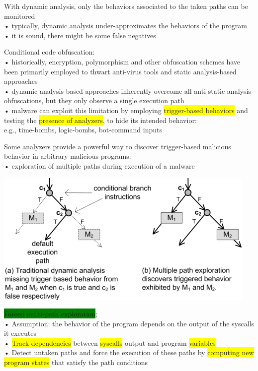 \documentclass[]{project_plan}
\begin{document}
With dynamic analysis, only the behaviors associated to the taken paths can be monitored\\
• typically, dynamic analysis under-approximates the behaviors of the program\\
• it is sound, there might be some false negatives

Conditional code obfuscation:\\
• historically, encryption, polymorphism and other obfuscation schemes have been primarily employed to
thwart anti-virus tools and static analysis-based approaches\\
• dynamic analysis based approaches inherently overcome all anti-static analysis obfuscations, but they
only observe a single execution path\\
• malware can exploit this limitation by employing \colorbox{yellow}{trigger-based behaviors} and testing the \colorbox{yellow}{presence of
  analyzers}, to hide its intended behavior:\\
e.g., time-bombs, logic-bombs, bot-command inputs

Some analyzers provide a powerful way to discover trigger-based malicious behavior in arbitrary
malicious programs:\\
• exploration of multiple paths during execution of a malware

\includegraphics[width=.6\linewidth]{conditional code obfuscation.png}

\colorbox{green}{Forced multi-path exploration};\\
• Assumption: the behavior of the program depends on the output of the
syscalls it executes\\
• \colorbox{yellow}{Track dependencies} between \colorbox{yellow}{syscalls} output and program \colorbox{yellow}{variables}\\
• Detect untaken paths and force the execution of these paths by \colorbox{yellow}{computing
  new program states} that satisfy the path conditions
\end{document}
